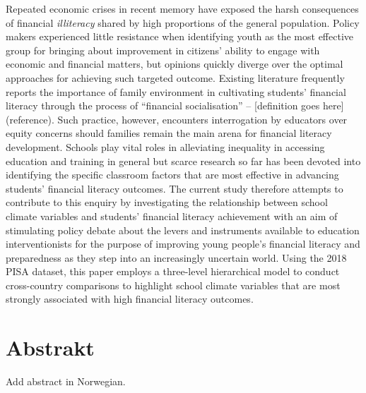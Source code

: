 \documentclass[a4paper,11pt,UKenglish,twoside,openright]{report}\usepackage[]{graphicx}\usepackage[]{color}
\begin{document}
Repeated economic crises in recent memory have exposed the harsh consequences of financial \emph{illiteracy} shared by high proportions of the general population. Policy makers experienced little resistance when identifying youth as the most effective group for bringing about improvement in citizens' ability to engage with economic and financial matters, but opinions quickly diverge over the optimal approaches for achieving such targeted outcome. Existing literature frequently reports the importance of family environment in cultivating students' financial literacy through the process of ``financial socialisation'' -- [definition goes here] (reference). Such practice, however, encounters interrogation by educators over equity concerns should families remain the main arena for financial literacy development. Schools play vital roles in alleviating inequality in accessing education and training in general but scarce research so far has been devoted into identifying the specific classroom factors that are most effective in advancing students' financial literacy outcomes. The current study therefore attempts to contribute to this enquiry by investigating the relationship between school climate variables and students' financial literacy achievement with an aim of stimulating policy debate about the levers and instruments available to education interventionists for the purpose of improving young people's financial literacy and preparedness as they step into an increasingly uncertain world. Using the 2018 PISA dataset, this paper employs a three-level hierarchical model to conduct cross-country comparisons to highlight school climate variables that are most strongly associated with high financial literacy outcomes.


\chapter*{Abstrakt}
\label{Ab.2}

\setcounter{page}{12}

Add abstract in Norwegian.

\clearpage
\thispagestyle{empty}

\setcounter{page}{0} %

\end{document}
